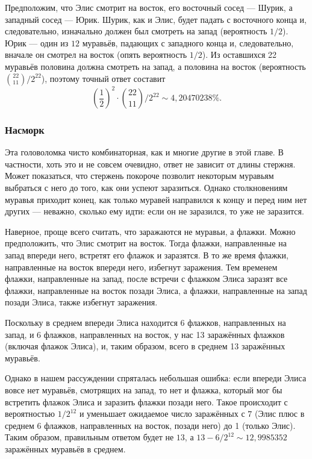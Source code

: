 Предположим, что Элис смотрит на восток, его восточный сосед --- Шурик, а западный сосед --- Юрик.
Шурик, как и Элис, будет падать с восточного конца и, следовательно, изначально должен был смотреть на запад (вероятность $1/2$).
Юрик --- один из $12$ муравьёв, падающих с западного конца и, следовательно, вначале он смотрел на восток (опять вероятность $1/2$).
Из оставшихся 22 муравьёв половина должна смотреть на запад, а половина на восток (вероятность $\binom{22}{11}/2^{22}$), поэтому точный ответ составит
\[\left(\frac12\right)^2\cdot\binom{22}{11}/2^{22}\sim 4{,}20470238\%.\]

\subsubsection*{Насморк}

Эта головоломка чисто комбинаторная, как и многие другие в этой главе.
В частности, хоть это и не совсем очевидно, ответ не зависит от длины стержня.
Может показаться, что стержень покороче позволит некоторым муравьям выбраться с него до того, как они успеют заразиться.
Однако столкновениям муравья приходит конец, как только муравей направился к концу и перед ним нет других --- неважно, сколько ему идти: если он не заразился, то уже не заразится.

Наверное, проще всего считать, что заражаются не муравьи, а флажки.
Можно предположить, что Элис смотрит на восток.
Тогда флажки, направленные на запад впереди него, встретят его флажок и заразятся.
В то же время флажки, направленные на восток впереди него, избегнут заражения.
Тем временем флажки, направленные на запад, после встречи с флажком Элиса заразят все флажки, направленные на восток позади Элиса, а флажки, направленные на запад позади Элиса, также избегнут заражения.

Поскольку в среднем впереди Элиса находится 6 флажков, направленных на запад, и 6 флажков, направленных на восток, у нас 13 заражённых флажков (включая флажок Элиса), и, таким образом, всего в среднем 13 заражённых муравьёв.

Однако в нашем рассуждении спряталась небольшая ошибка: если впереди Элиса вовсе нет муравьёв, смотрящих на запад, то нет и флажка, который мог бы встретить флажок Элиса и заразить флажки позади него.
Такое происходит с вероятностью $1/2^{12}$ и уменьшает ожидаемое число заражённых с $7$ (Элис плюс в среднем 6 флажков, направленных на восток, позади него) до 1 (только Элис).
Таким образом, правильным ответом будет не $13$, а $13 - 6/2^{12} \sim 12{,}9985352$ заражённых муравьёв в среднем.

